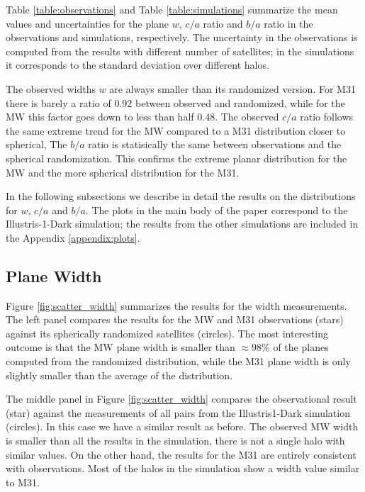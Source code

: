 \documentclass[a4paper,fleqn,usenatbib]{mnras}
\begin{document}
Table \ref{table:observations} and Table \ref{table:simulations}
summarize the mean values and uncertainties for the plane $w$, $c/a$
ratio and $b/a$ ratio in the observations and simulations, respectively. 
The uncertainty in the observations is computed from the results with
different number of satellites; in the simulations it corresponds to
the standard deviation over different halos.  

The observed widths $w$ are always smaller than its randomized version.
For M31 there is barely a ratio of $0.92$ between observed and
randomized, while for the MW this factor goes down to less than half
$0.48$. 
The observed $c/a$ ratio follows the same extreme trend for
the MW compared to a M31 distribution closer to spherical, 
The $b/a$ ratio is statisically the same between observations and the
spherical randomization. 
This confirms the extreme planar distribution for the MW and the more
spherical distribution for the M31.

In the following subsections we describe in detail the results on the 
distributions for $w$, $c/a$ and $b/a$. 
The plots in the main body of the paper correspond to the
Illustris-1-Dark simulation; the results from the other simulations
are included in the Appendix \ref{appendix:plots}.

\subsection{Plane Width}

Figure \ref{fig:scatter_width} summarizes the results for the width
measurements.
The left panel compares the results for the MW and M31
observations (stars) against its spherically randomized satellites
(circles). 
The most interesting outcome is that the MW plane width is smaller
than $\approx 98\%$ of the planes computed from the randomized distribution,
while the M31 plane width is only slightly smaller than the average of
the distribution.

The middle panel in Figure \ref{fig:scatter_width} compares the
observational result (star) against the measurements of all pairs from the Illustris1-Dark
simulation (circles).
In this case we have a similar result as before. 
The observed MW width is smaller than all the results in the
simulation, there is not a single halo with similar values.
On the other hand, the results for the M31 are entirely consistent
with observations. Most of the halos in the simulation show a width
value similar to M31. 
\end{document}
